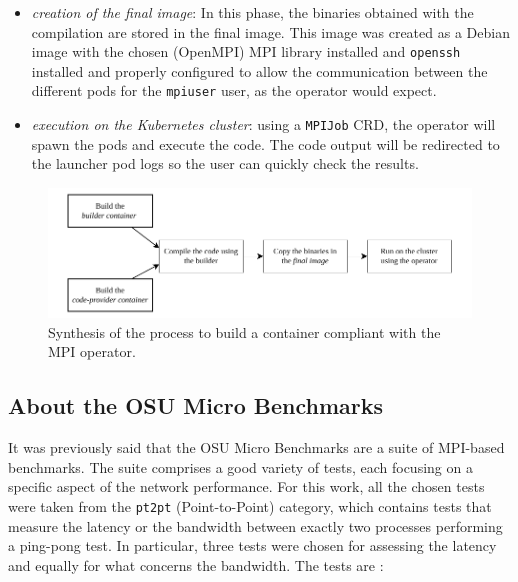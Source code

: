 \begin{itemize}
  \item \textit{creation of the final image}: In this phase, the binaries
    obtained with the compilation are stored in the final image. This image was
    created as a Debian image with the chosen (OpenMPI) MPI library installed
    and \texttt{openssh} installed and properly configured to allow the
    communication between the different pods for the \texttt{mpiuser} user, as
    the operator would expect.

  \item \textit{execution on the Kubernetes cluster}: using a \texttt{MPIJob}
    CRD, the operator will spawn the pods and execute the code. The code output
    will be redirected to the launcher pod logs so the user can quickly check the
    results.
\end{itemize}


\begin{figure}
  \centering
  \includegraphics[width=\textwidth]{img/chpt3/mpi-container-building}
  \caption{Synthesis of the process to build a container compliant with the MPI
    operator.}
  \label{fig:mpi-container-creation}
\end{figure}


\subsection{About the OSU Micro Benchmarks}

It was previously said that the OSU Micro Benchmarks are a suite of MPI-based
benchmarks. The suite comprises a good variety of tests, each focusing on a
specific aspect of the network performance.
For this work, all the chosen tests were taken from the \texttt{pt2pt}
(Point-to-Point) category, which contains tests that measure the latency or the
bandwidth between exactly two processes performing a ping-pong test.
In particular, three tests were chosen for assessing the latency and equally for
what concerns the bandwidth. The tests are \cite{osu}:

